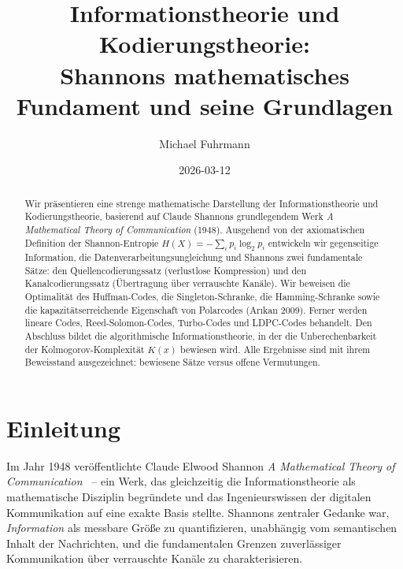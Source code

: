\documentclass[12pt,a4paper]{amsart}
\theoremstyle{definition}
\theoremstyle{remark}
\begin{document}
\title{Informationstheorie und Kodierungstheorie:\\
Shannons mathematisches Fundament und seine Grundlagen}

\author{Michael Fuhrmann}
\address{Specialist Mathematics Project, Build 145}
\date{2026-03-12}

\begin{abstract}
Wir präsentieren eine strenge mathematische Darstellung der Informationstheorie
und Kodierungstheorie, basierend auf Claude Shannons grundlegendem Werk
\emph{A Mathematical Theory of Communication} (1948). Ausgehend von der
axiomatischen Definition der Shannon-Entropie
$H(X) = -\sum_i p_i \log_2 p_i$ entwickeln wir gegenseitige Information,
die Datenverarbeitungsungleichung und Shannons zwei fundamentale Sätze: den
Quellencodierungssatz (verlustlose Kompression) und den Kanalcodierungssatz
(Übertragung über verrauschte Kanäle). Wir beweisen die Optimalität des
Huffman-Codes, die Singleton-Schranke, die Hamming-Schranke sowie die
kapazitätserreichende Eigenschaft von Polarcodes (Ar\i{}kan 2009). Ferner
werden lineare Codes, Reed-Solomon-Codes, Turbo-Codes und LDPC-Codes behandelt.
Den Abschluss bildet die algorithmische Informationstheorie, in der die
Unberechenbarkeit der Kolmogorov-Komplexität $K(x)$ bewiesen wird. Alle
Ergebnisse sind mit ihrem Beweisstand ausgezeichnet: bewiesene Sätze versus
offene Vermutungen.
\end{abstract}

\maketitle

\tableofcontents

\section{Einleitung}

Im Jahr 1948 veröffentlichte Claude Elwood Shannon \emph{A Mathematical Theory
of Communication}~\cite{Shannon1948} -- ein Werk, das gleichzeitig die
Informationstheorie als mathematische Disziplin begründete und das
Ingenieurswissen der digitalen Kommunikation auf eine exakte Basis stellte.
Shannons zentraler Gedanke war, \emph{Information} als messbare Größe zu
quantifizieren, unabhängig vom semantischen Inhalt der Nachrichten, und die
fundamentalen Grenzen zuverlässiger Kommunikation über verrauschte Kanäle
zu charakterisieren.
\end{document}
